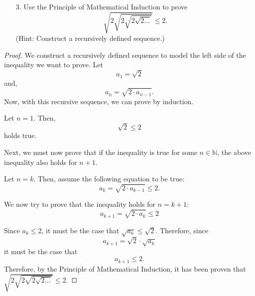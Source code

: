 \documentclass[10pt]{article}
\theoremstyle{definition}
\theoremstyle{plain}
\newcommand{\N}{\mathbb{N}}
\begin{document}
\pagebreak



\begin{enumerate}
  \item[3.] Use the Principle of Mathematical Induction to prove
  $$\sqrt{2\sqrt{2\sqrt{2\sqrt{2\dots}}}} \leq 2.$$
  (Hint:  Construct a recursively defined sequence.)
\end{enumerate}

\setcounter{equation}{0}
\begin{proof}
  We construct a recursively defined sequence to model the left side of the inequality we want to prove. Let
    $$a_1 = \sqrt{2}$$ and,
    $$a_n = \sqrt{2\cdot a_{n-1}}.$$
    Now, with this recursive sequence, we can prove by induction.

  Let $n=1$. Then,
  \begin{equation}
    \sqrt{2} \leq 2
  \end{equation}
  holds true.

  \par Next, we must now prove that if the inequality is true for some $n\in\N$, the above inequality also holds for $n+1$.

  \par Let $n=k$. Then, assume the following equation to be true:
  \begin{equation}
    a_k = \sqrt{2\cdot a_{k-1}} \leq 2.
  \end{equation}

  \par We now try to prove that the inequality holds for $n=k+1$:
  \begin{equation}
    a_{k+1} = \sqrt{2\cdot a_{k}} \leq 2
  \end{equation}

  \par Since $a_k \leq 2$, it must be the case that $\sqrt{a_k} \leq \sqrt{2}.$ Therefore, since
  \begin{equation}
    a_{k+1} = \sqrt{2}\cdot \sqrt{a_{k}}
  \end{equation}
  it must be the case that
  \begin{equation}
    a_{k+1} \leq 2.
  \end{equation}
  Therefore, by the Principle of Mathematical Induction, it has been proven that $\sqrt{2\sqrt{2\sqrt{2\sqrt{2\dots}}}} \leq 2.$
\end{proof}



\pagebreak
\end{document}

